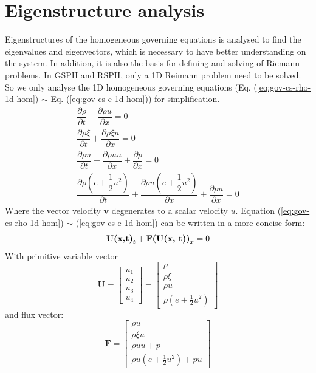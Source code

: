 \section{Eigenstructure analysis}

Eigenstructures of the homogeneous governing equations is analysed to find the eigenvalues and eigenvectors, which is necessary to have better understanding on the system. In addition, it is also the basis for defining and solving of Riemann problems. In GSPH and RSPH, only a 1D Reimann problem need to be solved. So we only analyse the 1D homogeneous governing equations (Eq. (\ref{eq:gov-cs-rho-1d-hom}) $\sim$ Eq. (\ref{eq:gov-cs-e-1d-hom})) for simplification.
\begin{align}
\dfrac{\partial \rho}{\partial t} + \dfrac{\partial \rho u} {\partial x}= 0 \label{eq:gov-cs-rho-1d-hom} \\
\dfrac{\partial \rho \xi}{\partial t} + \dfrac{\partial \rho \xi u} {\partial x}= 0 \label{eq:gov-cs-ks-1d-hom}\\
\dfrac{\partial \rho u}{\partial t} + \dfrac{\partial \rho u u} {\partial x} + \dfrac{\partial p} {\partial x}= 0 \label{eq:gov-cs-v-1d-hom} \\
\dfrac{\partial \rho (e+\dfrac{1}{2}u^2)}{\partial t} + \dfrac{\partial \rho u (e+\dfrac{1}{2}u^2) } {\partial x} + \dfrac{\partial pu} {\partial x} = 0 \label{eq:gov-cs-e-1d-hom}
\end{align}
Where the vector velocity $\textbf{v}$ degenerates to a scalar velocity $u$. Equation (\ref{eq:gov-cs-rho-1d-hom}) $\sim$ (\ref{eq:gov-cs-e-1d-hom}) can be written in a more concise form:
\begin{equation}
\textbf{U(x,t)}_t + \textbf{F(\textbf{U}(x, t))}_x = 0
\end{equation}
With primitive variable vector
\begin{equation}
   \textbf{U}=\begin{bmatrix}
         u_1 \\
         u_2 \\
         u_3 \\
         u_4
     \end{bmatrix}
    =\begin{bmatrix}
         \rho \\
         \rho\xi \\
         \rho u   \\
         \rho(e+\frac{1}{2}u^2)
     \end{bmatrix}
\end{equation}
and flux vector: 
\begin{equation}
   \textbf{F}=\begin{bmatrix}
         \rho u \\
         \rho\xi u \\
         \rho u  u + p  \\
         \rho u(e+\frac{1}{2}u^2) + pu
     \end{bmatrix}
\end{equation}

